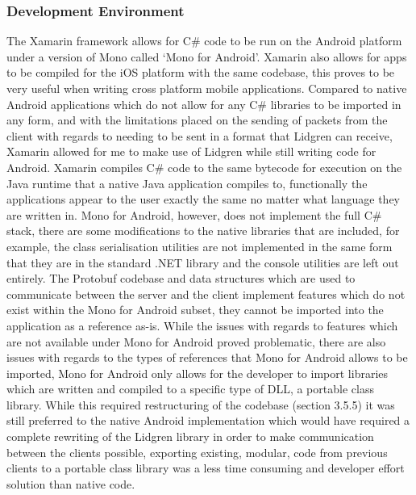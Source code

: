 \documentclass{article}
\begin{document}
\subsubsection{Development Environment}
The Xamarin framework allows for C\# code to be run on the Android platform under a version of Mono called ‘Mono for Android’. Xamarin also allows for apps to be compiled for the iOS platform with the same codebase, this proves to be very useful when writing cross platform mobile applications. Compared to native Android applications which do not allow for any C\# libraries to be imported in any form, and with the limitations placed on the sending of packets from the client with regards to needing to be sent in a format that Lidgren can receive, Xamarin allowed for me to make use of Lidgren while still writing code for Android. Xamarin compiles C\# code to the same bytecode for execution on the Java runtime that a native Java application compiles to, functionally the applications appear to the user exactly the same no matter what language they are written in. Mono for Android, however, does not implement the full C\# stack, there are some modifications to the native libraries that are included, for example, the class serialisation utilities are not implemented in the same form that they are in the standard .NET library and the console utilities are left out entirely. The Protobuf codebase and data structures which are used to communicate between the server and the client implement features which do not exist within the Mono for Android subset, they cannot be imported into the application as a reference as-is. While the issues with regards to features which are not available under Mono for Android proved problematic, there are also issues with regards to the types of references that Mono for Android allows to be imported, Mono for Android only allows for the developer to import libraries which are written and compiled to a specific type of DLL, a portable class library. While this required restructuring of the codebase (section 3.5.5) it was still preferred to the native Android implementation which would have required a complete rewriting of the Lidgren library in order to make communication between the clients possible, exporting existing, modular, code from previous clients to a portable class library was a less time consuming and developer effort solution than native code.
\end{document}
